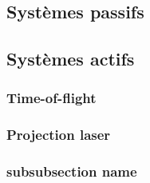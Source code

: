 \label{sec:capteurs}

\subsection{Systèmes passifs}

\subsection{Systèmes actifs}

\subsubsection{Time-of-flight}

\subsubsection{Projection laser}

\subsubsection{subsubsection name}
